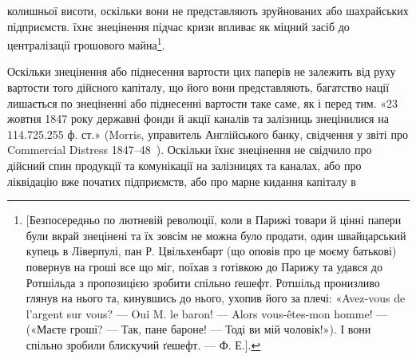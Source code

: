 колишньої висоти, оскільки вони не представляють зруйнованих або шахрайських
підприємств. їхнє знецінення підчас кризи впливає як міцний засіб до централізації
грошового майна\footnote{[Безпосередньо по лютневій революції, коли в Парижі товари й цінні папери були вкрай
знецінені та їх зовсім не можна було продати, один швайцарський купець в Ліверпулі, пан Р.
Цвільхенбарт
(що оповів про це моєму батькові) повернув на гроші все що міг, поїхав з готівкою до Парижу
та удався до Ротшільда з пропозицією зробити спільно ґешефт. Ротшільд пронизливо глянув на нього та,
кинувшись до нього, ухопив його за плечі: «Avez-vous de l’argent sur vous? — Oui M. le baron! —
Alors vous-êtes-mon homme! — («Маєте гроші? — Так, пане бароне! — Тоді ви мій чоловік!»).
І вони спільно зробили блискучий ґешефт. — Ф. Е.].}.

Оскільки знецінення або піднесення вартости цих паперів не залежить
від руху вартости того дійсного капіталу, що його вони представляють, багатство
нації лишається по знеціненні або піднесенні вартости таке саме, як і перед
тим. «23 жовтня 1847 року державні фонди й акції каналів та залізниць знецінилися
на 114.725.255 ф. ст.» (Morris, управитель Англійського банку, свідчення
у звіті про Commercial Distress 1847--48~). Оскільки їхнє знецінення не
свідчило про дійсний спин продукції та комунікації на залізницях та каналах,
або про ліквідацію вже початих підприємств, або про марне кидання капіталу в
\parbreak{}  %

